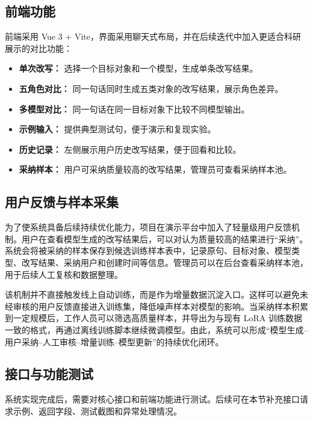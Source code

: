 \documentclass[12pt,a4paper]{ctexart}
\begin{document}
\subsection{前端功能}

前端采用 Vue 3 + Vite，界面采用聊天式布局，并在后续迭代中加入更适合科研展示的对比功能：

\begin{itemize}[leftmargin=2em]
  \item \textbf{单次改写：} 选择一个目标对象和一个模型，生成单条改写结果。
  \item \textbf{五角色对比：} 同一句话同时生成五类对象的改写结果，展示角色差异。
  \item \textbf{多模型对比：} 同一句话在同一目标对象下比较不同模型输出。
  \item \textbf{示例输入：} 提供典型测试句，便于演示和复现实验。
  \item \textbf{历史记录：} 左侧展示用户历史改写结果，便于回看和比较。
  \item \textbf{采纳样本：} 用户可采纳质量较高的改写结果，管理员可查看采纳样本池。
\end{itemize}

\subsection{用户反馈与样本采集}

为了使系统具备后续持续优化能力，项目在演示平台中加入了轻量级用户反馈机制。用户在查看模型生成的改写结果后，可以对认为质量较高的结果进行“采纳”。系统会将被采纳的样本保存到候选训练样本表中，记录原句、目标对象、模型类型、改写结果、采纳用户和创建时间等信息。管理员可以在后台查看采纳样本池，用于后续人工复核和数据整理。

该机制并不直接触发线上自动训练，而是作为增量数据沉淀入口。这样可以避免未经审核的用户反馈直接进入训练集，降低噪声样本对模型的影响。当采纳样本积累到一定规模后，工作人员可以筛选高质量样本，并导出为与现有 LoRA 训练数据一致的格式，再通过离线训练脚本继续微调模型。由此，系统可以形成“模型生成--用户采纳--人工审核--增量训练--模型更新”的持续优化闭环。

\subsection{接口与功能测试}

系统实现完成后，需要对核心接口和前端功能进行测试。后续可在本节补充接口请求示例、返回字段、测试截图和异常处理情况。
\end{document}
